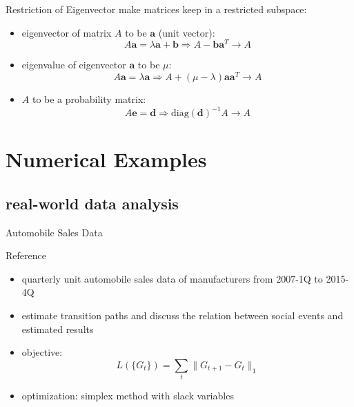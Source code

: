 \documentclass[fleqn,aspectratio=1610]{beamer}
\begin{document}
\begin{frame}[label={sec:org86b34f4}]{Restriction of Eigenvector}
make matrices keep in a restricted subspace:
\begin{itemize}
\item eigenvector of matrix \(A\) to be
\(\boldsymbol{a}\) (unit vector):
\begin{equation}
  A\boldsymbol{a}=\lambda \boldsymbol{a}+\boldsymbol{b}
  \Rightarrow A-\boldsymbol{b}\boldsymbol{a}^T \rightarrow A
\end{equation}
\item eigenvalue of eigenvector \(\boldsymbol{a}\)
to be \(\mu\):
\begin{equation}
  A\boldsymbol{a}=\lambda \boldsymbol{a}
  \Rightarrow A+(\mu-\lambda)\boldsymbol{a}\boldsymbol{a}^T \rightarrow A
\end{equation}
\item \(A\) to be a probability matrix:
\begin{equation}
  A\boldsymbol{e}=\boldsymbol{d}
  \Rightarrow \mathrm{diag}(\boldsymbol{d})^{-1}A \rightarrow A
\end{equation}
\end{itemize}
\end{frame}

\section{Numerical Examples}
\label{sec:orga2d433d}
\subsection{real-world data analysis}
\label{sec:orgdf7fa27}
\begin{frame}[label={sec:org6e1d8e7}]{Automobile Sales Data}
\begin{block}{Reference}
\citeauthor{Chiba_etal2017}
\end{block}
\begin{itemize}
\item quarterly unit automobile sales data of manufacturers from
2007-1Q to 2015-4Q
\item estimate transition paths and discuss the relation between
social events and estimated results
\item objective:
\begin{equation}
  L(\{G_t\}) = \sum_t \|G_{t+1}-G_t\|_{1}
\end{equation}
\item optimization:
simplex method with slack variables
\end{itemize}
\end{frame}
\end{document}
